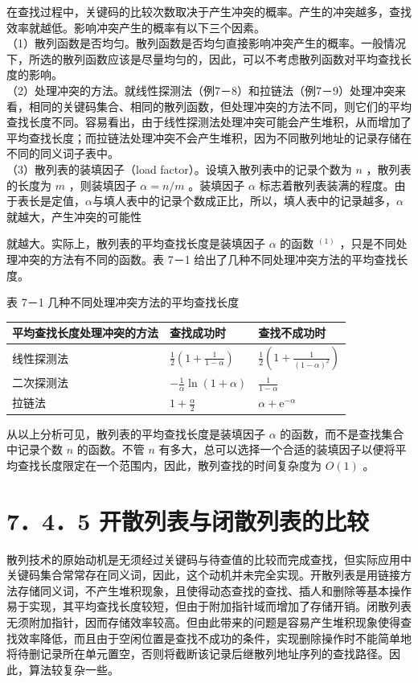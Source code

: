 \documentclass[10pt]{article}
\begin{document}
在查找过程中，关键码的比较次数取决于产生冲突的概率。产生的冲突越多，查找效率就越低。影响冲突产生的概率有以下三个因素。\\
（1）散列函数是否均匀。散列函数是否均匀直接影响冲突产生的概率。一般情况下，所选的散列函数应该是尽量均匀的，因此，可以不考虑散列函数对平均查找长度的影响。\\
（2）处理冲突的方法。就线性探测法（例7－8）和拉链法（例7－9）处理冲突来看，相同的关键码集合、相同的散列函数，但处理冲突的方法不同，则它们的平均查找长度不同。容易看出，由于线性探测法处理冲突可能会产生堆积，从而增加了平均查找长度；而拉链法处理冲突不会产生堆积，因为不同散列地址的记录存储在不同的同义词子表中。\\
（3）散列表的装填因子（load factor）。设填入散列表中的记录个数为 $n$ ，散列表的长度为 $m$ ，则装填因子 $\alpha=n / m$ 。装填因子 $\alpha$ 标志着散列表装满的程度。由于表长是定值，$\alpha$与填人表中的记录个数成正比，所以，填人表中的记录越多，$\alpha$ 就越大，产生冲突的可能性

就越大。实际上，散列表的平均查找长度是装填因子 $\alpha$ 的函数 ${ }^{(1)}$ ，只是不同处理冲突的方法有不同的函数。表 7－1 给出了几种不同处理冲突方法的平均查找长度。

表 7－1 几种不同处理冲突方法的平均查找长度

\begin{center}
\begin{tabular}{|l|l|l|}
\hline
平均查找长度处理冲突的方法 & 查找成功时 & 查找不成功时 \\
\hline
线性探测法 & $\frac{1}{2}\left(1+\frac{1}{1-\alpha}\right)$ & $\frac{1}{2}\left(1+\frac{1}{(1-\alpha)^{2}}\right)$ \\
\hline
二次探测法 & $-\frac{1}{\alpha} \ln (1+\alpha)$ & $\frac{1}{1-\alpha}$ \\
\hline
拉链法 & $1+\frac{\alpha}{2}$ & $\alpha+\mathrm{e}^{-\alpha}$ \\
\hline
\end{tabular}
\end{center}

从以上分析可见，散列表的平均查找长度是装填因子 $\alpha$ 的函数，而不是查找集合中记录个数 $n$ 的函数。不管 $n$ 有多大，总可以选择一个合适的装填因子以便将平均查找长度限定在一个范围内，因此，散列查找的时间复杂度为 $O(1)$ 。

\section*{7．4．5 开散列表与闭散列表的比较}
散列技术的原始动机是无须经过关键码与待查值的比较而完成查找，但实际应用中关键码集合常常存在同义词，因此，这个动机并未完全实现。开散列表是用链接方法存储同义词，不产生堆积现象，且使得动态查找的查找、插人和删除等基本操作易于实现，其平均查找长度较短，但由于附加指针域而增加了存储开销。闭散列表无须附加指针，因而存储效率较高。但由此带来的问题是容易产生堆积现象使得查找效率降低，而且由于空闲位置是查找不成功的条件，实现删除操作时不能简单地将待删记录所在单元置空，否则将截断该记录后继散列地址序列的查找路径。因此，算法较复杂一些。
\end{document}
